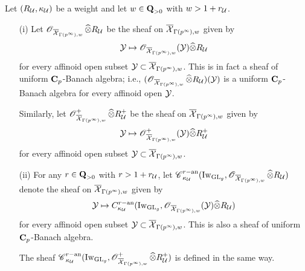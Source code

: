 \begin{Definition}\label{Definition: the sheaf of overconvergent Siegel forms}Let $(R_{\calU}, \kappa_{\calU})$ be a weight and let $w\in \Q_{>0}$ with $w> 1+r_{\calU}$.
\begin{enumerate}
\item[(i)] Let $\scrO_{\overline{\calX}_{\Gamma(p^{\infty}), w}}\widehat{\otimes}R_{\calU}$ be the sheaf on $\overline{\calX}_{\Gamma(p^{\infty}), w}$ given by $$\calY\mapsto \scrO_{\overline{\calX}_{\Gamma(p^{\infty}), w}}(\calY)\widehat{\otimes}R_{\calU}$$ for every affinoid open subset $\calY\subset \overline{\calX}_{\Gamma(p^{\infty}), w}$. This is in fact a sheaf of uniform $\C_p$-Banach algebra; i.e., $(\scrO_{\overline{\calX}_{\Gamma(p^{\infty}), w}}\widehat{\otimes}R_{\calU})(\calY)$ is a uniform $\C_p$-Banach algebra for every affinoid open $\calY$.

Similarly, let $\scrO^+_{\overline{\calX}_{\Gamma(p^{\infty}), w}}\widehat{\otimes}R^+_{\calU}$ be the sheaf on $\overline{\calX}_{\Gamma(p^{\infty}), w}$ given by $$\calY\mapsto \scrO^+_{\overline{\calX}_{\Gamma(p^{\infty}), w}}(\calY)\widehat{\otimes}R^+_{\calU}$$ for every affinoid open subset $\calY\subset \overline{\calX}_{\Gamma(p^{\infty}), w}$.
\item[(ii)] For any $r\in \Q_{>0}$ with $r>1+ r_{\calU}$, let $\scrC^{r-\an}_{\kappa_{\calU}}(\Iw_{\GL_g}, \scrO_{\overline{\calX}_{\Gamma(p^{\infty}), w}}\widehat{\otimes}R_{\calU})$ denote the sheaf on $\overline{\calX}_{\Gamma(p^{\infty}), w}$ given by 
$$\calY\mapsto C^{r-\an}_{\kappa_{\calU}}(\Iw_{\GL_g}, \scrO_{\overline{\calX}_{\Gamma(p^{\infty}), w}}(\calY)\widehat{\otimes}R_{\calU})$$ for every affinoid open subset $\calY\subset \overline{\calX}_{\Gamma(p^{\infty}), w}$. This is also a sheaf of uniform $\C_p$-Banach algebra.

The sheaf $\scrC^{r-\an}_{\kappa_{\calU}}(\Iw_{\GL_g}, \scrO^+_{\overline{\calX}_{\Gamma(p^{\infty}), w}}\widehat{\otimes}R^+_{\calU})$ is defined in the same way.


\end{enumerate}
\end{Definition}
